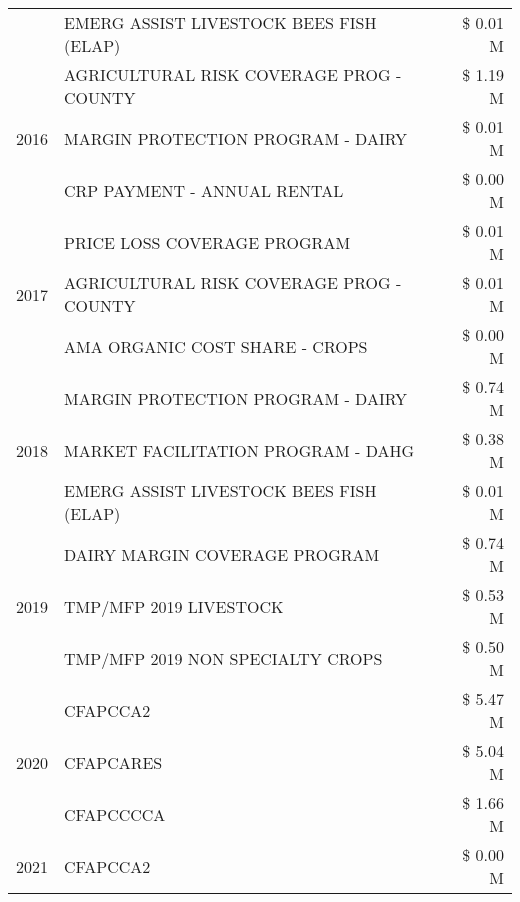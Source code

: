 \begin{tabular}{llr}
 & EMERG ASSIST LIVESTOCK BEES FISH (ELAP) & \$ 0.01 M \\
\cline{1-3}
\multirow[t]{3}{*}{2016} & AGRICULTURAL RISK COVERAGE PROG - COUNTY & \$ 1.19 M \\
 & MARGIN PROTECTION PROGRAM - DAIRY & \$ 0.01 M \\
 & CRP PAYMENT - ANNUAL RENTAL & \$ 0.00 M \\
\cline{1-3}
\multirow[t]{3}{*}{2017} & PRICE LOSS COVERAGE PROGRAM & \$ 0.01 M \\
 & AGRICULTURAL RISK COVERAGE PROG - COUNTY & \$ 0.01 M \\
 & AMA ORGANIC COST SHARE - CROPS & \$ 0.00 M \\
\cline{1-3}
\multirow[t]{3}{*}{2018} & MARGIN PROTECTION PROGRAM - DAIRY & \$ 0.74 M \\
 & MARKET FACILITATION PROGRAM - DAHG & \$ 0.38 M \\
 & EMERG ASSIST LIVESTOCK BEES FISH (ELAP) & \$ 0.01 M \\
\cline{1-3}
\multirow[t]{3}{*}{2019} & DAIRY MARGIN COVERAGE PROGRAM & \$ 0.74 M \\
 & TMP/MFP 2019 LIVESTOCK & \$ 0.53 M \\
 & TMP/MFP 2019 NON SPECIALTY CROPS & \$ 0.50 M \\
\cline{1-3}
\multirow[t]{3}{*}{2020} & CFAPCCA2 & \$ 5.47 M \\
 & CFAPCARES & \$ 5.04 M \\
 & CFAPCCCCA & \$ 1.66 M \\
\cline{1-3}
2021 & CFAPCCA2 & \$ 0.00 M \\
\cline{1-3}
\bottomrule
\end{tabular}
